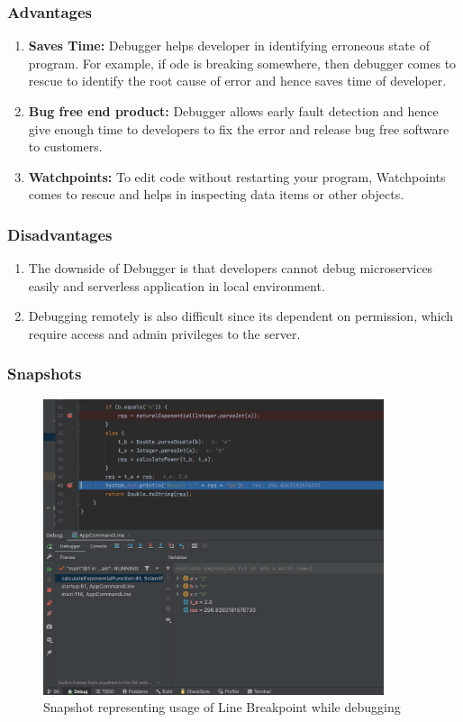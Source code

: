 \documentclass[a4paper,12pt]{report}
\begin{document}
\subsubsection{Advantages}
\begin{enumerate}
    \item \textbf{Saves Time:} Debugger helps developer in identifying erroneous state of program. For example, if ode is breaking somewhere, then debugger comes to rescue to identify the root cause of error and hence saves time of developer.
    \item \textbf{Bug free end product: } Debugger allows early fault detection and hence give enough time to developers to fix the error and release bug free software to customers.
    \item \textbf{Watchpoints: } To edit code without restarting your program, Watchpoints comes to rescue and helps in inspecting data items or other objects.
\end{enumerate}
\subsubsection{Disadvantages}
\begin{enumerate}
    \item The downside of Debugger is that developers cannot debug microservices easily and serverless application in local environment.\cite{b9}
    \item Debugging remotely is also difficult since its dependent on permission, which require access and admin privileges to the server.\cite{b9}
\end{enumerate}
\subsubsection{Snapshots}

\begin{figure}
\centering
\includegraphics[width=10cm]{LineBreakpoint.png}
\caption{Snapshot representing usage of Line Breakpoint while debugging}
\label{exp}
\end{figure}
\end{document}
